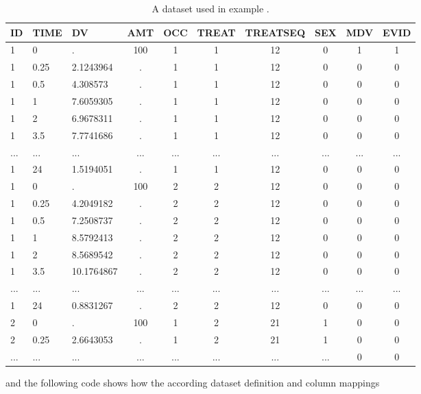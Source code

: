 \begin{table}[htdp]
\begin{center}
\small
\renewcommand{\arraystretch}{1.1}%
\begin{tabular}{lllccccccc}\toprule
ID	& TIME	& DV			& AMT	& OCC	& TREAT	& TREATSEQ	& SEX 	& MDV 	& EVID \\ \midrule
1	& 0		& .			& 100	& 1		& 1		& 12			& 0 		& 1		& 1 \\ 
1	& 0.25	& 2.1243964	& .		& 1		& 1		& 12			& 0 		& 0		& 0 \\ 
1	& 0.5	& 4.308573	& .		& 1		& 1		& 12			& 0 		& 0		& 0  \\ 
1	& 1		& 7.6059305	& .		& 1		& 1		& 12			& 0 		& 0		& 0  \\ 
1	& 2		& 6.9678311	& .		& 1		& 1		& 12			& 0 		& 0		& 0  \\ 
1	& 3.5	& 7.7741686	& .		& 1		& 1		& 12			& 0 		& 0		& 0  \\ 
...	& ...		& ...			& ...		& ...		&...		& ...			& ... 		& ...		& ...  \\
1	& 24		& 1.5194051	& .		& 1		& 1		& 12			& 0 		& 0		& 0  \\ 
1	& 0		& .			& 100	& 2		& 2		& 12			& 0 		& 0		& 0  \\ 
1	& 0.25	& 4.2049182	& .		& 2		& 2		& 12			& 0 		& 0		& 0  \\ 
1	& 0.5	& 7.2508737	& .		& 2		& 2		& 12			& 0 		& 0		& 0  \\ 
1	& 1		& 8.5792413	& .		& 2		& 2		& 12			& 0 		& 0		& 0  \\ 
1	& 2		& 8.5689542	& .		& 2		& 2		& 12			& 0 		& 0		& 0  \\ 
1	& 3.5	& 10.1764867	& .		& 2		& 2		& 12			& 0 		& 0		& 0  \\ 
...	& ...		& ...			& ...		& ...		&...		& ...			& ... 		& ...		& ...  \\
1	& 24		& 0.8831267	& .		& 2		& 2		& 12			& 0 		& 0		& 0  \\ 
2	& 0		& .			& 100	& 1		& 2		& 21			& 1 		& 0		& 0  \\ 
2	& 0.25	& 2.6643053	& .		& 1		& 2		& 21			& 1 		& 0		& 0  \\ 
...	& ...		& ...			& ...		& ...		&...		& ...			& ... 		& 0		& 0  \\ \bottomrule
\end{tabular}
\end{center}
\caption{A dataset used in example \theexamples.}
\label{tab:example4_dataSet}
\end{table}%
and the following code shows how the according dataset definition and column mappings 
